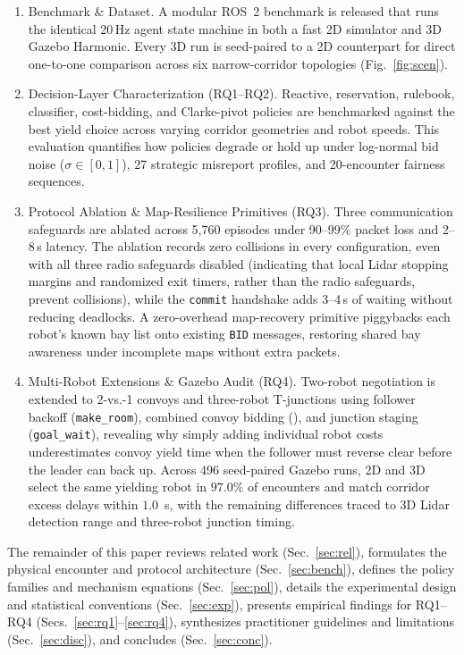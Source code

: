 \begin{enumerate}
\item Benchmark \& Dataset.
A modular ROS~2 benchmark is released that runs the identical 20\,Hz agent state machine in both a fast 2D simulator and 3D Gazebo Harmonic. Every 3D run is seed-paired to a 2D counterpart for direct one-to-one comparison across six narrow-corridor topologies (Fig.~\ref{fig:scen}).

\item Decision-Layer Characterization (RQ1--RQ2).
Reactive, reservation, rulebook, classifier, cost-bidding, and Clarke-pivot policies are benchmarked against the best yield choice across varying corridor geometries and robot speeds. This evaluation quantifies how policies degrade or hold up under log-normal bid noise ($\sigma\in[0,1]$), 27 strategic misreport profiles, and 20-encounter fairness sequences.

\item Protocol Ablation \& Map-Resilience Primitives (RQ3).
Three communication safeguards are ablated across 5,760 episodes under 90--99\% packet loss and 2--8\,s latency. The ablation records zero collisions in every configuration, even with all three radio safeguards disabled (indicating that local Lidar stopping margins and randomized exit timers, rather than the radio safeguards, prevent collisions), while the \texttt{commit} handshake adds 3--4\,s of waiting without reducing deadlocks. A zero-overhead map-recovery primitive piggybacks each robot's known bay list onto existing \texttt{BID} messages, restoring shared bay awareness under incomplete maps without extra packets.

\item Multi-Robot Extensions \& Gazebo Audit (RQ4).
Two-robot negotiation is extended to 2-vs.-1 convoys and three-robot T-junctions using follower backoff (\texttt{make\_room}), combined convoy bidding (\gb), and junction staging (\texttt{goal\_wait}), revealing why simply adding individual robot costs underestimates convoy yield time when the follower must reverse clear before the leader can back up. Across 496 seed-paired Gazebo runs, 2D and 3D select the same yielding robot in $97.0\%$ of encounters and match corridor excess delays within $1.0$~s, with the remaining differences traced to 3D Lidar detection range and three-robot junction timing.
\end{enumerate}

The remainder of this paper reviews related work (Sec.~\ref{sec:rel}), formulates the physical encounter and protocol architecture (Sec.~\ref{sec:bench}), defines the policy families and mechanism equations (Sec.~\ref{sec:pol}), details the experimental design and statistical conventions (Sec.~\ref{sec:exp}), presents empirical findings for RQ1--RQ4 (Secs.~\ref{sec:rq1}--\ref{sec:rq4}), synthesizes practitioner guidelines and limitations (Sec.~\ref{sec:disc}), and concludes (Sec.~\ref{sec:conc}).